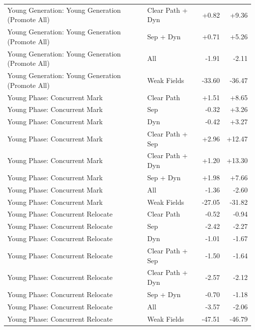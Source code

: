 \begin{table}[t]
\begin{tabular}{llrr}
Young Generation: Young Generation (Promote All) & Clear Path + Dyn & +0.82 & +9.36 \\
Young Generation: Young Generation (Promote All) & Sep + Dyn & +0.71 & +5.26 \\
Young Generation: Young Generation (Promote All) & All & -1.91 & -2.11 \\
Young Generation: Young Generation (Promote All) & Weak Fields & -33.60 & -36.47 \\
Young Phase: Concurrent Mark & Clear Path & +1.51 & +8.65 \\
Young Phase: Concurrent Mark & Sep & -0.32 & +3.26 \\
Young Phase: Concurrent Mark & Dyn & -0.42 & +3.27 \\
Young Phase: Concurrent Mark & Clear Path + Sep & +2.96 & +12.47 \\
Young Phase: Concurrent Mark & Clear Path + Dyn & +1.20 & +13.30 \\
Young Phase: Concurrent Mark & Sep + Dyn & +1.98 & +7.66 \\
Young Phase: Concurrent Mark & All & -1.36 & -2.60 \\
Young Phase: Concurrent Mark & Weak Fields & -27.05 & -31.82 \\
Young Phase: Concurrent Relocate & Clear Path & -0.52 & -0.94 \\
Young Phase: Concurrent Relocate & Sep & -2.42 & -2.27 \\
Young Phase: Concurrent Relocate & Dyn & -1.01 & -1.67 \\
Young Phase: Concurrent Relocate & Clear Path + Sep & -1.50 & -1.64 \\
Young Phase: Concurrent Relocate & Clear Path + Dyn & -2.57 & -2.12 \\
Young Phase: Concurrent Relocate & Sep + Dyn & -0.70 & -1.18 \\
Young Phase: Concurrent Relocate & All & -3.57 & -2.06 \\
Young Phase: Concurrent Relocate & Weak Fields & -47.51 & -46.79 \\
\bottomrule
\end{tabular}
\end{table}
